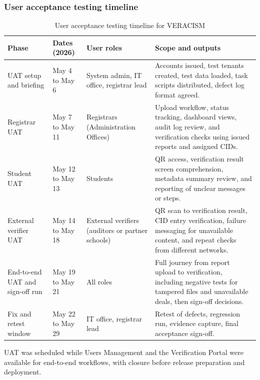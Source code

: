 \subsubsection{User acceptance testing timeline}

\begin{table}[H]
  \centering
  \smalltable
  \footnotesize

  {%
  \setlength{\tabcolsep}{8pt}%
  \renewcommand{\arraystretch}{1.4}%

  \begin{tabular}{|>{\raggedright\arraybackslash}p{}|
                  >{\raggedright\arraybackslash}p{}|
                  >{\raggedright\arraybackslash}p{}|
                  >{\raggedright\arraybackslash}p{}|}
    \hline
    \textbf{Phase} & \textbf{Dates (2026)} & \textbf{User roles} & \textbf{Scope and outputs} \\
    \hline\hline
    UAT setup and briefing &
    May 4 to May 6 &
    System admin, IT office, registrar lead &
    Accounts issued, test tenants created, test data loaded, task scripts distributed, defect log format agreed. \\
    \hline
    Registrar UAT &
    May 7 to May 11 &
    Registrars (Administration Offices) &
    Upload workflow, status tracking, dashboard views, audit log review, and verification checks using issued reports and assigned CIDs. \\
    \hline
    Student UAT &
    May 12 to May 13 &
    Students &
    QR access, verification result screen comprehension, metadata summary review, and reporting of unclear messages or steps. \\
    \hline
    External verifier UAT &
    May 14 to May 18 &
    External verifiers (auditors or partner schools) &
    QR scan to verification result, CID entry verification, failure messaging for unavailable content, and repeat checks from different networks. \\
    \hline
    End-to-end UAT and sign-off run &
    May 19 to May 21 &
    All roles &
    Full journey from report upload to verification, including negative tests for tampered files and unavailable deals, then sign-off decisions. \\
    \hline
    Fix and retest window &
    May 22 to May 29 &
    IT office, registrar lead &
    Retest of defects, regression run, evidence capture, final acceptance sign-off. \\
    \hline
  \end{tabular}
  }%

  \captionsetup{type=table}
  \caption{User acceptance testing timeline for VERACISM}
  \label{tab:uat-schedule}
\end{table}

UAT was scheduled while Users Management and the Verification Portal were available for end-to-end workflows, with closure before release preparation and deployment.